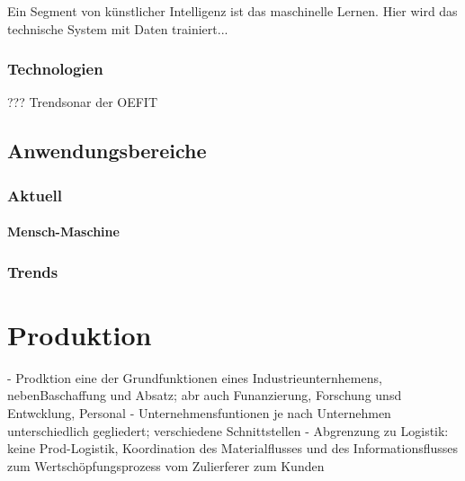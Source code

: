 \documentclass[a4paper,12pt, german]{report}
\begin{document}
Ein Segment von künstlicher Intelligenz ist das maschinelle Lernen. Hier wird das technische System mit Daten trainiert...


\subsubsection{Technologien}

??? 
Trendsonar der OEFIT


\subsection{Anwendungsbereiche}

\subsubsection{Aktuell}

\paragraph{Mensch-Maschine}

\subsubsection{Trends}




\section{Produktion}

- Prodktion eine der Grundfunktionen eines Industrieunternhemens, nebenBaschaffung und Absatz; abr auch Funanzierung, Forschung unsd Entwcklung, Personal 
- Unternehmensfuntionen je nach Unternehmen unterschiedlich gegliedert; verschiedene Schnittstellen
- Abgrenzung zu Logistik: keine Prod-Logistik, Koordination des Materialflusses und des Informationsflusses zum Wertschöpfungsprozess vom Zulierferer zum Kunden
\cite{07}
\end{document}
